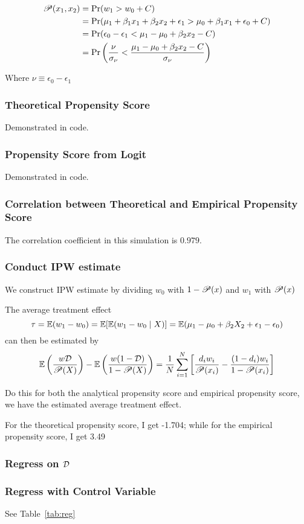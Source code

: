 \begin{align*}
    \mathscr{P}(x_1, x_2) &= \Pr(w_1 > w_0 + C) \\
    &= \Pr(\mu_1 + \beta_1 x_1 + \beta_2 x_2 + \epsilon_1 > \mu_0 + \beta_1 x_1  + \epsilon_0 + C) \\
    &= \Pr(\epsilon_0 - \epsilon_1 < 
        \mu_1 - \mu_0 + \beta_2 x_2 - C
    ) \\
    &= \Pr\left(
        \frac{\nu}{\sigma_\nu} < 
        \frac{\mu_1 - \mu_0 + \beta_2 x_2 - C}{\sigma_\nu}
        \right)
\end{align*}

Where $\nu \equiv \epsilon_0 - \epsilon_1$

\subsubsection{Theoretical Propensity Score}

Demonstrated in code. 

\subsubsection{Propensity Score from Logit}

Demonstrated in code.

\subsubsection{Correlation between Theoretical and Empirical Propensity Score}

The correlation coefficient in this simulation is $0.979$.

\subsubsection{Conduct IPW estimate}
We construct IPW estimate by dividing $w_0$ with $1-\mathscr{P}(x)$ 
and $w_1$ with $\mathscr{P}(x)$

The average treatment effect
$$
    \tau = \operatorname{\mathbb{E}}(w_1 - w_0) = \operatorname{\mathbb{E}}[\operatorname{\mathbb{E}}(w_1 - w_0 \mid X)] = \operatorname{\mathbb{E}}(\mu_1 - \mu_0 + \beta_2 X_2 + \epsilon_1 - \epsilon_0)
$$
can then be estimated by
\begin{equation}
    \operatorname{\mathbb{E}}\left( \frac{w\mathcal{D}}{\mathscr{P}(X)} \right) - \operatorname{\mathbb{E}}\left( \frac{w(1-\mathcal{D})}{1 - \mathscr{P}(X)} \right)
    = \frac{1}{N} \sum_{i=1}^N \left[
        \frac{d_i w_i}{\mathscr{P}(x_i)} - \frac{(1-d_i) w_i}{1 - \mathscr{P}(x_i)}
    \right]
\end{equation}

Do this for both the analytical propensity score and empirical propensity score, 
we have the estimated average treatment effect.

For the theoretical propensity score, I get -1.704; 
while for the empirical propensity score, I get 3.49

\subsubsection{Regress on $\mathcal{D}$}


\subsubsection{Regress with Control Variable}
See Table~\ref{tab:reg}

